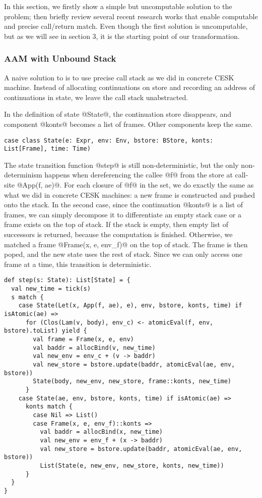 \documentclass[acmsmall,review,anonymous]{acmart}\settopmatter{printfolios=true,printccs=false,printacmref=false}
\begin{document}
In this section, we firstly show a simple but uncomputable solution to the
problem; then briefly review several recent research works that enable
computable and precise call/return match. Even though the first solution is
uncomputable, but as we will see in section 3, it is the starting point of our
transformation. 

\subsubsection{AAM with Unbound Stack}

A naive solution to is to use precise call stack as we did in concrete
CESK machine. Instead of allocating continuations on store and recording an 
address of continuations in state, we leave the call stack unabstracted. 

In the definition of state @State@, the continuation store disappears, and
component @konts@ becomes a list of frames. Other components keep the same.

\begin{lstlisting}
case class State(e: Expr, env: Env, bstore: BStore, konts: List[Frame], time: Time)
\end{lstlisting}

The state transition function @step@ is still non-deterministic, but
the only non-determinism happens when dereferencing the callee @f@ 
from the store at call-site @App(f, ae)@. 
For each closure of @f@ in the set, we do exactly
the same as what we did in concrete CESK machines: a new frame is constructed
and pushed onto the stack.
In the second case, since the continuation @konts@ is a list of 
frames, we can simply decompose it to differentiate an empty stack case
or a frame exists on the top of stack. 
If the stack is empty, then empty list of successors is returned, 
because the computation is finished.
Otherwise, we matched a frame @Frame(x, e, env_f)@ on the top of stack.
The frame is then poped, and the new state uses the rest of stack.
Since we can only access one frame at a time, this transition is deterministic.

\begin{lstlisting}
def step(s: State): List[State] = {
  val new_time = tick(s)
  s match {
    case State(Let(x, App(f, ae), e), env, bstore, konts, time) if isAtomic(ae) =>
      for (Clos(Lam(v, body), env_c) <- atomicEval(f, env, bstore).toList) yield {
        val frame = Frame(x, e, env)
        val baddr = allocBind(v, new_time)
        val new_env = env_c + (v -> baddr)
        val new_store = bstore.update(baddr, atomicEval(ae, env, bstore))
        State(body, new_env, new_store, frame::konts, new_time)
      }
    case State(ae, env, bstore, konts, time) if isAtomic(ae) =>
      konts match {
        case Nil => List()
        case Frame(x, e, env_f)::konts =>
          val baddr = allocBind(x, new_time)
          val new_env = env_f + (x -> baddr)
          val new_store = bstore.update(baddr, atomicEval(ae, env, bstore))
          List(State(e, new_env, new_store, konts, new_time))
      }
  }
}
\end{lstlisting}
\end{document}
